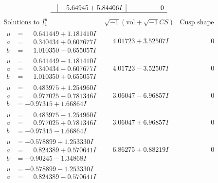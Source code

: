 \documentclass[1p]{elsarticle_modified}
\theoremstyle{definition}
\newcommand{\I}{\sqrt{-1}}
\begin{document}
$$\begin{array}{c|c|c}
 & \phantom{-}5.64945 + 5.84406 I & \phantom{-0.000000 } 0\\
 \hline 
 \end{array}$$\newpage$$\begin{array}{c|c|c}  
\text{Solutions to }I^u_{1}& \I (\text{vol} + \sqrt{-1}CS) & \text{Cusp shape}\\
 \hline 
\begin{aligned}
u &= \phantom{-}0.641449 + 1.181410 I \\
a &= \phantom{-}0.340434 + 0.607677 I \\
b &= \phantom{-}1.010350 - 0.655057 I\end{aligned}
 & \phantom{-}4.01723 + 3.52507 I & \phantom{-0.000000 } 0 \\ \hline\begin{aligned}
u &= \phantom{-}0.641449 - 1.181410 I \\
a &= \phantom{-}0.340434 - 0.607677 I \\
b &= \phantom{-}1.010350 + 0.655057 I\end{aligned}
 & \phantom{-}4.01723 - 3.52507 I & \phantom{-0.000000 } 0 \\ \hline\begin{aligned}
u &= \phantom{-}0.483975 + 1.254960 I \\
a &= \phantom{-}0.977025 - 0.781346 I \\
b &= -0.97315 + 1.66864 I\end{aligned}
 & \phantom{-}3.06047 - 6.96857 I & \phantom{-0.000000 } 0 \\ \hline\begin{aligned}
u &= \phantom{-}0.483975 - 1.254960 I \\
a &= \phantom{-}0.977025 + 0.781346 I \\
b &= -0.97315 - 1.66864 I\end{aligned}
 & \phantom{-}3.06047 + 6.96857 I & \phantom{-0.000000 } 0 \\ \hline\begin{aligned}
u &= -0.578899 + 1.253330 I \\
a &= \phantom{-}0.824389 + 0.570641 I \\
b &= -0.90245 - 1.34868 I\end{aligned}
 & \phantom{-}6.86275 + 0.88219 I & \phantom{-0.000000 } 0 \\ \hline\begin{aligned}
u &= -0.578899 - 1.253330 I \\
a &= \phantom{-}0.824389 - 0.570641 I \\

\end{aligned}
\end{array}$$
\end{document}
